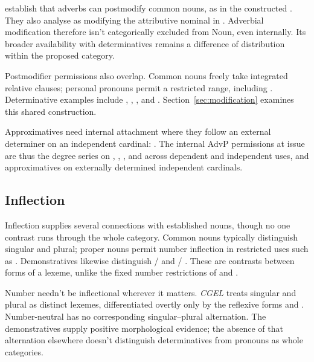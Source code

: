 \documentclass[12pt]{article}
\begin{document}
\textcite[42--47]{payne2010} establish that adverbs can postmodify common nouns, as in the constructed . They also analyse  as modifying the attributive nominal  in  \citep[p.~75, n.~3]{payne2010}. Adverbial modification therefore isn't categorically excluded from Noun, even internally. Its broader availability with determinatives remains a difference of distribution within the proposed category.

Postmodifier permissions also overlap. Common nouns freely take integrated relative clauses; personal pronouns permit a restricted range, including  \citep[430]{huddleston2002}. Determinative examples include , , , and . Section~\ref{sec:modification} examines this shared construction.

Approximatives need internal attachment where they follow an external determiner on an independent cardinal: . The internal AdvP permissions at issue are thus the degree series on , , , and  across dependent and independent uses, and approximatives on externally determined independent cardinals.

\subsection{Inflection}\label{sec:inflection}

Inflection supplies several connections with established nouns, though no one contrast runs through the whole category. Common nouns typically distinguish singular and plural; proper nouns permit number inflection in restricted uses such as . Demonstratives likewise distinguish / and / \citep[373, 521]{huddleston2002}. These are contrasts between forms of a lexeme, unlike the fixed number restrictions of  and .

Number needn't be inflectional wherever it matters. \textit{CGEL} treats singular and plural  as distinct lexemes, differentiated overtly only by the reflexive forms  and  \citep[486]{huddleston2002}. Number-neutral  has no corresponding singular--plural alternation. The demonstratives supply positive morphological evidence; the absence of that alternation elsewhere doesn't distinguish determinatives from pronouns as whole categories.
\end{document}
